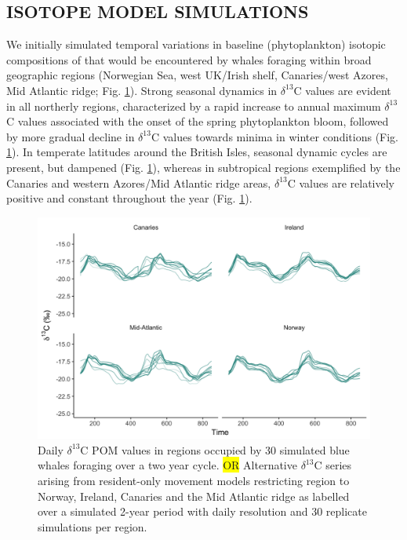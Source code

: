 \documentclass[a4paper,12pt]{article}
\newcommand{\hilight}[1]{\colorbox{yellow}{#1}}
\begin{document}
\subsection*{ISOTOPE MODEL SIMULATIONS}
We initially simulated temporal variations in baseline (phytoplankton) isotopic compositions of that would be encountered by whales foraging within broad geographic regions (Norwegian Sea, west UK/Irish shelf, Canaries/west Azores, Mid Atlantic ridge; Fig. \ref{figs4}). 
Strong seasonal dynamics in $\delta^{13}$C values are evident in all northerly regions, characterized by a rapid increase to annual maximum $\delta^{13}$C values associated with the onset of the spring phytoplankton bloom, followed by more gradual decline in $\delta^{13}$C values towards minima in winter conditions (Fig. \ref{figs4}). 
In temperate latitudes around the British Isles, seasonal dynamic cycles are present, but dampened (Fig. \ref{figs4}), whereas in subtropical regions exemplified by the Canaries and western Azores/Mid Atlantic ridge areas, $\delta^{13}$C values are relatively positive and constant throughout the year (Fig. \ref{figs4}).
 
  \begin{figure}[!htbp]
    \centering
      \includegraphics[width=\linewidth]{figures/Figure-S4-facet-wrap-d13C.png}
      \caption{Daily $\delta^{13}$C POM values in regions occupied by 30 simulated blue whales foraging over a two year cycle. \hilight{OR} Alternative $\delta^{13}$C series arising from resident-only movement models restricting region to Norway, Ireland, Canaries and the Mid Atlantic ridge as labelled over a simulated 2-year period with daily resolution and 30 replicate simulations per region.  } %
      \label{figs4}
  \end{figure}
 
\end{document}
